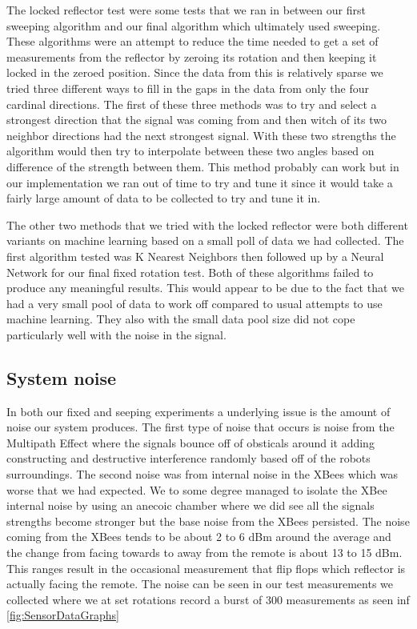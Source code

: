 The locked reflector test were some tests that we ran in between our first sweeping algorithm and our final algorithm which ultimately used sweeping. These algorithms were an attempt to reduce the time needed to get a set of measurements from the reflector by zeroing its rotation and then keeping it locked in the zeroed position.  Since the data from this is relatively sparse we tried three different ways to fill in the gaps in the data from only the four cardinal directions. The first of these three methods was to try and select a strongest direction that the signal was coming from and then witch of its two neighbor directions had the next strongest signal. With these two strengths the algorithm would then try to interpolate between these two angles based on difference of the strength between them. This method probably can work but in our implementation we ran out of time to try and tune it since it would take a fairly large amount of data to be collected to try and tune it in.\par
The other two methods that we tried with the locked reflector were both different variants on machine learning based on a small poll of data we had collected. The first algorithm tested was K Nearest Neighbors then followed up by a Neural Network for our final fixed rotation test.  Both of these algorithms failed to produce any meaningful results.  This would appear to be due to the fact that we had a very small pool of data to work off compared to usual attempts to use machine learning. They also with the small data pool size did not cope particularly well with the noise in the signal.

\subsection{System noise}

In both our fixed and seeping experiments a underlying issue is the amount of noise our system produces.  The first type of noise that occurs is noise from the Multipath Effect where the signals bounce off of obsticals around it adding constructing and destructive interference randomly based off of the robots surroundings.  The second noise was from internal noise in the XBees which was worse that we had expected.  We to some degree managed to isolate the XBee internal noise by using an anecoic chamber where we did see all the signals strengths become stronger but the base noise from the XBees persisted. The noise coming from the XBees tends to be about 2 to 6 dBm around the average and the change from facing towards to away from the remote is about 13 to 15 dBm.  This ranges result in the occasional measurement that flip flops which reflector is actually facing the remote. The noise can be seen in our test measurements we collected where we at set rotations record a burst of 300 measurements as seen inf \autoref{fig:SensorDataGraphs}

